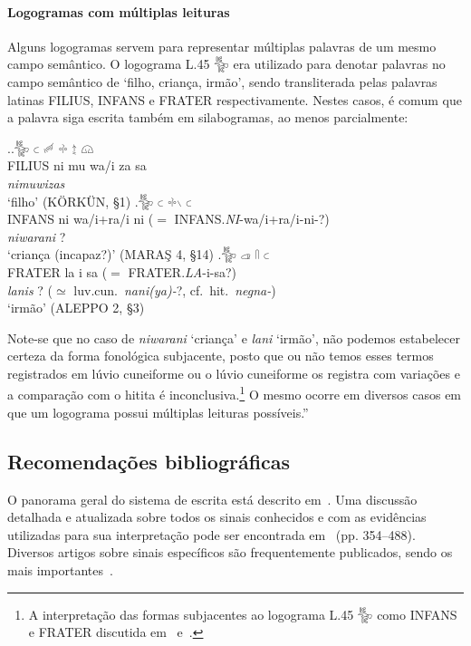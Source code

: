 \paragraph{Logogramas com múltiplas leituras}
Alguns logogramas servem para representar múltiplas palavras de um mesmo campo
semântico.
O logograma L.45 𔐰 era utilizado para denotar palavras no campo semântico de
`filho, criança, irmão', sendo transliterada pelas palavras latinas FILIUS,
INFANS e FRATER respectivamente. Nestes casos, é comum que a palavra siga
escrita também em silabogramas, ao menos parcialmente:

\ex.\ag.\Large 𔐰 \Large 𔗐 \Large 𔑿 \Large 𔗬 \Large 𔖪 \Large 𔗔\\
FILIUS ni mu wa\slash{}i za sa\\
\emph{nimuwizas} \\
`filho' (KÖRKÜN, §1)
\bg.\Large 𔐰 \Large 𔗐 \Large 𔗬𔖱 \Large 𔗐\\
INFANS ni wa\slash{}i+ra\slash{}i ni ($=$ INFANS.\emph{NI}-wa/i+ra/i-ni-?)\\
\emph{niwarani}{ }? \\
`criança (incapaz?)' (MARAŞ 4, §14)
\bg.\Large 𔐰 \Large 𔓊 \Large 𔓯 \Large 𔗐\\
FRATER la i sa ($=$ FRATER.\emph{LA}-i-sa?)\\
\emph{lanis}{ }?  ($\simeq$ luv.cun.\ \emph{nani{(ya)}-}?, cf.\ hit.\ \emph{negna-})\\
`irmão' (ALEPPO 2, §3)


\noindent Note-se que no caso de \emph{niwarani} `criança' e \emph{lani} `irmão',
não podemos estabelecer certeza da forma fonológica subjacente, posto que ou não
temos esses termos registrados em lúvio cuneiforme ou o lúvio cuneiforme os
registra com variações e a comparação com o hitita
é inconclusiva.\footnote{A interpretação das formas subjacentes ao logograma
	L.45 𔐰 como INFANS e FRATER discutida em~\citet[143--6]{Hawkins1980}
	e~\citet[387]{Yakubovich2010b}.}
O mesmo ocorre em diversos casos em que um logograma possui múltiplas leituras
possíveis.''

\subsection{Recomendações bibliográficas}

O panorama geral do sistema de escrita está descrito
em~\citet[p. 155ff.]{HawkinsScripts}.
Uma discussão detalhada e atualizada sobre todos os sinais conhecidos e com
as evidências utilizadas para sua interpretação pode ser encontrada
em~ (pp. 354--488).
Diversos artigos sobre sinais específicos são frequentemente publicados, sendo
os mais
importantes~\citet{HawkinsMorpurgoNeumann1974,Rieken2008,RiekenYakubovich2010}.

